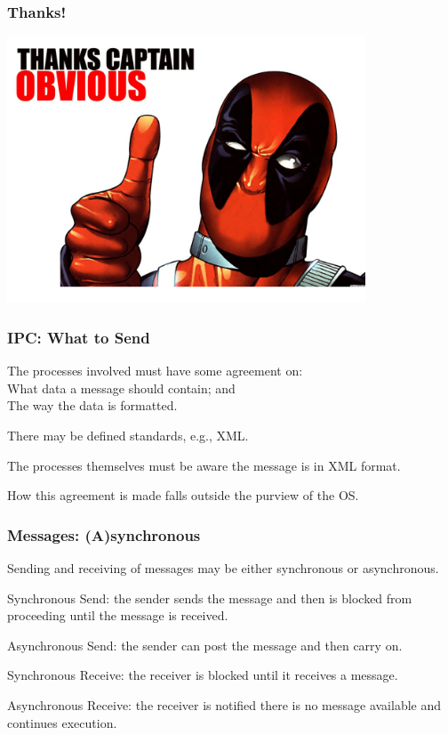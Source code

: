 \begin{frame}
	\frametitle{Thanks!}

	\begin{center}
		\includegraphics[width=0.8\textwidth]{images/thanks-captain-obvious}
	\end{center}


\end{frame}


\begin{frame}
	\frametitle{IPC: What to Send}

	The processes involved must have some agreement on:\\
	\quad What data a message should contain; and\\
	\quad The way the data is formatted.

	There may be defined standards, e.g., XML.

	The processes themselves must be aware the message is in XML format.

	How this agreement is made falls outside the purview of the OS.

\end{frame}

\begin{frame}
	\frametitle{Messages: (A)synchronous}

	Sending and receiving of messages may be either synchronous or asynchronous.

	Synchronous Send: the sender sends the message and then is blocked from proceeding until the message is received.

	Asynchronous Send: the sender can post the message and then carry on.

	Synchronous Receive: the receiver is blocked until it receives a message.

	Asynchronous Receive: the receiver is notified there is no message available and continues execution.

\end{frame}

